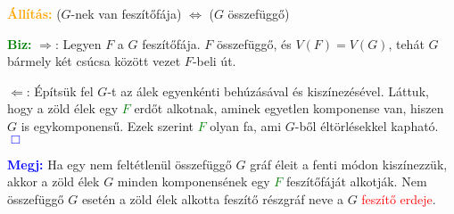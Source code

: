 \documentclass[../szamtud.tex]{subfiles}
\begin{document}
        \textcolor{orange}{\textbf{Állítás:}} ($G$-nek van feszítőfája) $\Longleftrightarrow$ ($G$ összefüggő)

        \textcolor{green}{\textbf{Biz:}} $\Rightarrow$: Legyen $F$ a $G$ feszítőfája. $F$ összefüggő, és $V(F)=V(G)$, tehát $G$ bármely két csúcsa között vezet $F$-beli út.

        $\Leftarrow$: Építsük fel $G$-t az álek egyenkénti behúzásával és kiszínezésével. Láttuk, hogy a zöld élek egy \textcolor{green}{$F$} erdőt alkotnak, aminek egyetlen komponense van, hiszen $G$ is egykomponensű. Ezek szerint \textcolor{green}{$F$} olyan fa, ami $G$-ből éltörlésekkel kapható. \textcolor{blue}{$\Box$} 
    
        \textcolor{blue}{\textbf{Megj:}} Ha egy nem feltétlenül összefüggő $G$ gráf éleit a fenti módon kiszínezzük, akkor a zöld élek $G$ minden komponensének egy \textcolor{green}{$F$} feszítőfáját alkotják. Nem összefüggő $G$ esetén a zöld élek alkotta feszítő részgráf neve a $G$ \textcolor{red}{feszítő erdeje}.
\end{document}
